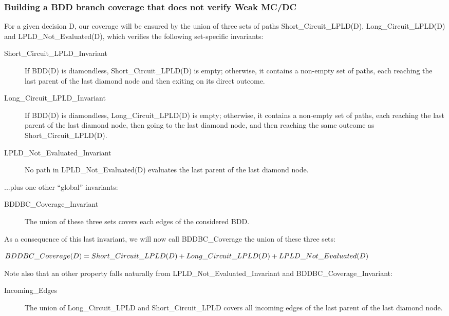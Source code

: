 \documentclass[a4paper,12pt,twoside]{article}
\begin{document}
\subsubsection{Building a BDD branch coverage that does not verify Weak MC/DC}

For a given decision D, our coverage will be ensured by the union of
three sets of paths Short\_Circuit\_LPLD(D), Long\_Circuit\_LPLD(D) and
LPLD\_Not\_Evaluated(D), which verifies the following set-specific
invariants:

\begin{description}
\item[Short\_Circuit\_LPLD\_Invariant]
  If BDD(D) is diamondless, Short\_Circuit\_LPLD(D) is empty;
  otherwise, it contains a non-empty set of paths, each reaching the
  last parent of the last diamond node and then exiting on its direct
  outcome.

\item[Long\_Circuit\_LPLD\_Invariant]
  If BDD(D) is diamondless, Long\_Circuit\_LPLD(D) is empty;
  otherwise, it contains a non-empty set of paths, each reaching the last
  parent of the last diamond node, then going to the last diamond node, and
  then reaching the same outcome as Short\_Circuit\_LPLD(D).

\item[LPLD\_Not\_Evaluated\_Invariant]
  No path in LPLD\_Not\_Evaluated(D) evaluates the last parent of the last
  diamond node.
\end{description}

...plus one other ``global'' invariants:

\begin{description}
\item[BDDBC\_Coverage\_Invariant]
 The union of these three sets covers each edges of the considered
 BDD.
\end{description}

As a consequence of this last invariant, we will now call
BDDBC\_Coverage the union of these three sets:

  $BDDBC\_Coverage(D) = Short\_Circuit\_LPLD(D)\\
                         + Long\_Circuit\_LPLD(D) + LPLD\_Not\_Evaluated(D)$

Note also that an other property falls naturally from
LPLD\_Not\_Evaluated\_Invariant and BDDBC\_Coverage\_Invariant:

\begin{description}
\item[Incoming\_Edges]
  The union of Long\_Circuit\_LPLD and Short\_Circuit\_LPLD covers all incoming
  edges of the last parent of the last diamond node.
\end{description}
\end{document}
